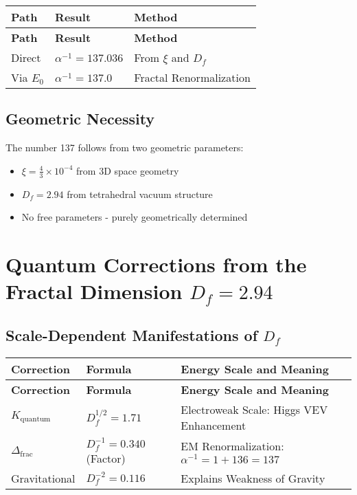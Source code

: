 \documentclass[12pt,a4paper]{article}
\begin{document}
	\begin{longtable}{|p{3cm}|p{3cm}|p{5cm}|}
		\hline
		\textbf{Path} & \textbf{Result} & \textbf{Method} \\
		\hline
		\endfirsthead
		\hline
		\textbf{Path} & \textbf{Result} & \textbf{Method} \\
		\hline
		\endhead
		Direct & \(\alpha^{-1} = 137.036\) & From \(\xi\) and \(D_f\) \\
		\hline
		Via \(E_0\) & \(\alpha^{-1} = 137.0\) & Fractal Renormalization \\
		\hline
	\end{longtable}
	
	\subsection{Geometric Necessity}
	
	The number 137 follows from two geometric parameters:
	\begin{itemize}
		\item \(\xi = \frac{4}{3} \times 10^{-4}\) from 3D space geometry
		\item \(D_f = 2.94\) from tetrahedral vacuum structure
		\item No free parameters - purely geometrically determined
	\end{itemize}
	\section{Quantum Corrections from the Fractal Dimension \(D_f = 2.94\)}
	
	\subsection{Scale-Dependent Manifestations of \(D_f\)}
	
	\begin{longtable}{|p{4cm}|p{3cm}|p{6cm}|}
		\hline
		\textbf{Correction} & \textbf{Formula} & \textbf{Energy Scale and Meaning} \\
		\hline
		\endfirsthead
		\hline
		\textbf{Correction} & \textbf{Formula} & \textbf{Energy Scale and Meaning} \\
		\hline
		\endhead
		\(K_{\text{quantum}}\) & \(D_f^{1/2} = 1.71\) & Electroweak Scale: Higgs VEV Enhancement \\
		\hline
		\(\Delta_{\text{frac}}\) & \(D_f^{-1} = 0.340\) (Factor) & EM Renormalization: \(\alpha^{-1} = 1 + 136 = 137\) \\
		\hline
		Gravitational & \(D_f^{-2} = 0.116\) & Explains Weakness of Gravity \\
		\hline
	\end{longtable}
	
\end{document}
